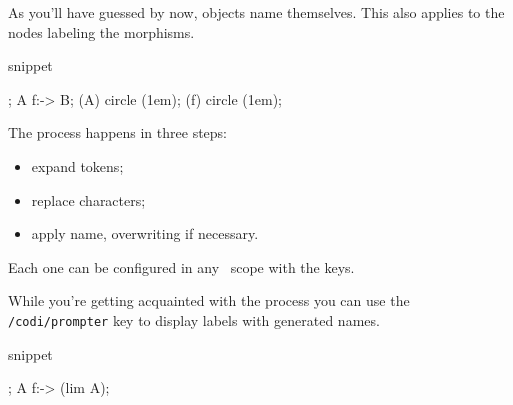As you'll have guessed by now, objects name themselves.
This also applies to the nodes labeling the morphisms.

\begin{tcblisting}{snippet}
\begin{codi}
  ;
  \mor A f:-> B;
  \draw [red] (A) circle (1em);
  \draw [blue] (f) circle (1em);
\end{codi}
\end{tcblisting}

The process happens in three steps:
\begin{itemize}[nosep]
  \item expand tokens;
  \item replace characters;
  \item apply name, overwriting if necessary.
\end{itemize}

Each one can be configured in any \CoDi\ scope with the keys.

While you're getting acquainted with the process
you can use the \lstinline|/codi/prompter| key to
display labels with generated names.

\begin{tcblisting}{snippet}
\begin{codi}[prompter]
  ;
  \mor A f:-> (lim A);
\end{codi}
\end{tcblisting}
